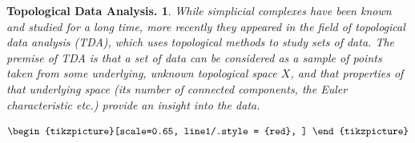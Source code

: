 \documentclass[11pt, letterpaper, oneside]{report}
\theoremstyle{pplain}
\newtheorem{ITERMVALUE THM}[theorem]{Intermediate Value Theorem}
\newtheorem{HEINEBOREL THM}[theorem]{Heine-Borel Theorem}
\newtheorem{UMETR THM}[theorem]{Urysohn Metrization Theorem}
\newtheorem{UMETR2 THM}[theorem]{Urysohn Metrization Theorem (v.2)}
\theoremstyle{ddefinition}
\theoremstyle{nnn}
\newtheorem{TDA NN}[theorem]{Topological Data Analysis. }
\theoremstyle{eexercise}
\begin{document}
\begin{TDA NN}
While simplicial complexes have been known and studied for a long time, more recently they 
appeared in the field of topological data analysis (TDA), which uses topological 
methods to study sets of data. The premise of TDA is that a set of data can be considered as  
a sample of points taken from some underlying, unknown topological space $X$, and that properties 
of that underlying space  (its number of connected  components,  the Euler characteristic etc.) provide 
an insight into the data.  

\begin{equation*}
\begin{tikzpicture}[scale=0.65,
                              line1/.style = {red},
                             ]
                             

\end{tikzpicture}
\end{equation*}
\end{TDA NN}
\end{document}
